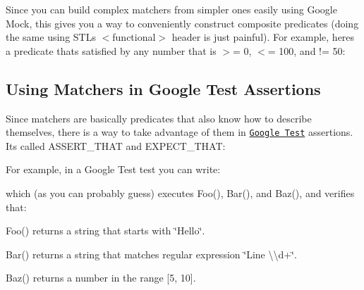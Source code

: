 Since you can build complex matchers from simpler ones easily using Google Mock, this gives you a way to conveniently construct composite predicates (doing the same using S\+TL\textquotesingle{}s {\ttfamily $<$functional$>$} header is just painful). For example, here\textquotesingle{}s a predicate that\textquotesingle{}s satisfied by any number that is $>$= 0, $<$= 100, and != 50\+:


\begin{DoxyCode}{0}
\end{DoxyCode}


\subsection*{Using Matchers in Google Test Assertions}

Since matchers are basically predicates that also know how to describe themselves, there is a way to take advantage of them in \href{../../googletest/}{\tt Google Test} assertions. It\textquotesingle{}s called {\ttfamily A\+S\+S\+E\+R\+T\+\_\+\+T\+H\+AT} and {\ttfamily E\+X\+P\+E\+C\+T\+\_\+\+T\+H\+AT}\+:


\begin{DoxyCode}{0}
\end{DoxyCode}


For example, in a Google Test test you can write\+:


\begin{DoxyCode}{0}
\DoxyCodeLine{}
\DoxyCodeLine{}
\end{DoxyCode}


which (as you can probably guess) executes {\ttfamily Foo()}, {\ttfamily Bar()}, and {\ttfamily Baz()}, and verifies that\+:


\begin{DoxyItemize}
\item {\ttfamily Foo()} returns a string that starts with {\ttfamily \char`\"{}\+Hello\char`\"{}}.
\item {\ttfamily Bar()} returns a string that matches regular expression {\ttfamily \char`\"{}\+Line \textbackslash{}\textbackslash{}d+\char`\"{}}.
\item {\ttfamily Baz()} returns a number in the range \mbox{[}5, 10\mbox{]}.
\end{DoxyItemize}

